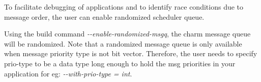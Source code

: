 To facilitate debugging of applications and to identify race conditions due to
message order, the user can enable randomized scheduler queue. 

Using the build command {\em -{}-enable-randomized-msgq}, the charm message queue
will be randomized. Note that a randomized message queue is only available when
message priority type is not bit vector.  Therefore, the user needs to specify
prio-type to be a data type long enough to hold the msg priorities in your
application for eg: {\em -{}-with-prio-type = int}.
